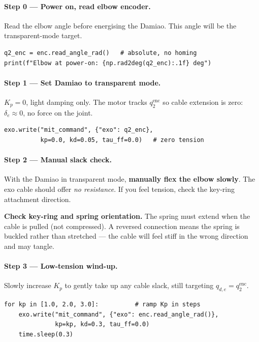 \documentclass[11pt,a4paper]{article}
\begin{document}
\paragraph{Step 0 --- Power on, read elbow encoder.}
Read the elbow angle before energising the Damiao.  This angle will be the
transparent-mode target.\
\begin{lstlisting}[caption={Read elbow angle before energising Damiao.}]
q2_enc = enc.read_angle_rad()   # absolute, no homing
print(f"Elbow at power-on: {np.rad2deg(q2_enc):.1f} deg")
\end{lstlisting}

\paragraph{Step 1 --- Set Damiao to transparent mode.}
$K_p = 0$, light damping only.  The motor tracks $q_2^{\mathrm{enc}}$ so
cable extension is zero: $\delta_e \approx 0$, no force on the joint.
\begin{lstlisting}[caption={Damiao transparent mode from power-on.}]
exo.write("mit_command", {"exo": q2_enc},
          kp=0.0, kd=0.05, tau_ff=0.0)   # zero tension
\end{lstlisting}

\paragraph{Step 2 --- Manual slack check.}
With the Damiao in transparent mode, \textbf{manually flex the elbow slowly}.
The exo cable should offer \emph{no resistance}.  If you feel tension,
check the key-ring attachment direction.

\begin{warnbox}
  \textbf{Check key-ring and spring orientation.}
  The spring must extend when the cable is pulled (not compressed).
  A reversed connection means the spring is buckled rather than stretched ---
  the cable will feel stiff in the wrong direction and may tangle.
\end{warnbox}

\paragraph{Step 3 --- Low-tension wind-up.}
Slowly increase $K_p$ to gently take up any cable slack, still targeting
$q_{d,e} = q_2^{\mathrm{enc}}$.
\begin{lstlisting}[caption={Low-tension wind-up for exo cable.}]
for kp in [1.0, 2.0, 3.0]:          # ramp Kp in steps
    exo.write("mit_command", {"exo": enc.read_angle_rad()},
              kp=kp, kd=0.3, tau_ff=0.0)
    time.sleep(0.3)
\end{lstlisting}
\end{document}
